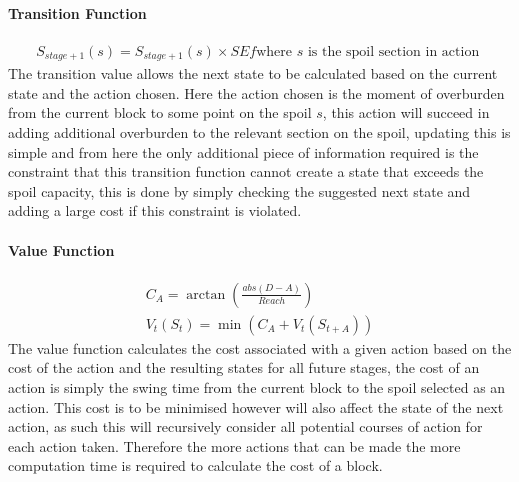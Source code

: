 \paragraph*{Transition Function}
\begin{align}
\label{Transition}
S_{stage+1}(s)=S_{stage+1}(s)\times SEf  \text{where $s$ is the spoil section in action }
\end{align}
The transition value allows the next state to be calculated based on the current state and the action chosen. Here the action chosen is the moment of overburden from the current block to some point on the spoil $s$, this action will succeed in adding additional overburden to the relevant section on the spoil, updating this is simple and from here the only additional piece of information required is the constraint that this transition function cannot create a state that exceeds the spoil capacity, this is done by simply checking the suggested next state and adding a large cost if this constraint is violated. 
\paragraph*{Value Function}
\begin{align}
\label{value}
C_A = \arctan(\frac{abs(D-A)}{Reach})\\
V_t(S_t) = \min (C_A+V_t(S_{t+A}))
\end{align}
The value function calculates the cost associated with a given action based on the cost of the action and the resulting states for all future stages, the cost of an action is simply the swing time from the current block to the spoil selected as an action. This cost is to be minimised however will also affect the state of the next action, as such this will recursively consider all potential courses of action for each action taken. Therefore the more actions that can be made the more computation time is required to calculate the cost of a block. 
